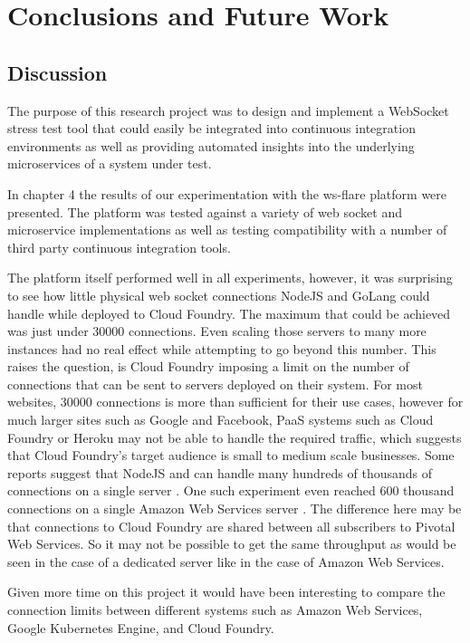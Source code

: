 \chapter{Conclusions and Future Work}

\section{Discussion}

The purpose of this research project was to design and implement a WebSocket stress test tool that could easily be integrated into continuous integration environments as well as providing automated insights into the underlying microservices of a system under test.

In chapter 4 the results of our experimentation with the ws-flare platform were presented. The platform was tested against a variety of web socket and microservice implementations as well as testing compatibility with a number of third party continuous integration tools. 

The platform itself performed well in all experiments, however, it was surprising to see how little physical web socket connections NodeJS and GoLang could handle while deployed to Cloud Foundry. The maximum that could be achieved was just under 30000 connections. Even scaling those servers to many more instances had no real effect while attempting to go beyond this number. This raises the question, is Cloud Foundry imposing a limit on the number of connections that can be sent to servers deployed on their system. For most websites, 30000 connections is more than sufficient for their use cases, however for much larger sites such as Google and Facebook, PaaS systems such as Cloud Foundry or Heroku may not be able to handle the required traffic, which suggests that Cloud Foundry's target audience is small to medium scale businesses. Some reports suggest that NodeJS and can handle many hundreds of thousands of connections on a single server \cite{nodeConnections}. One such experiment even reached 600 thousand connections on a single Amazon Web Services server \cite{nodeConnections}. The difference here may be that connections to Cloud Foundry are shared between all subscribers to Pivotal Web Services. So it may not be possible to get the same throughput as would be seen in the case of a dedicated server like in the case of Amazon Web Services. 

Given more time on this project it would have been interesting to compare the connection limits between different systems such as Amazon Web Services, Google Kubernetes Engine, and Cloud Foundry. 

